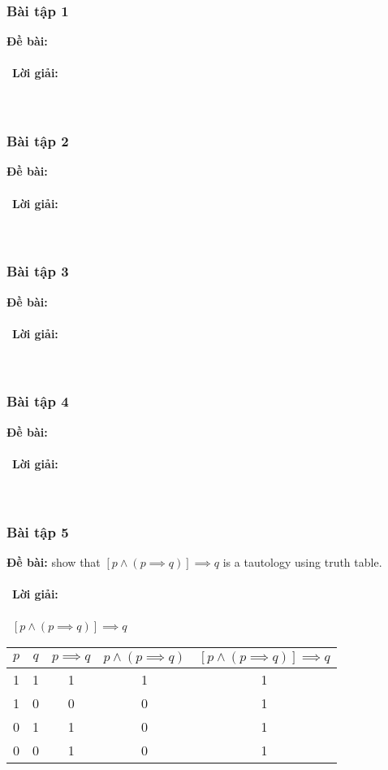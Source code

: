 \documentclass[a4paper]{article}
\begin{document}
\subsubsection{Bài tập 1}
\textbf{Đề bài:} 
\\\ \\\
\textbf{Lời giải:} \\\ \\\
\clearpage
\subsubsection{Bài tập 2}
\textbf{Đề bài:} 
\\\ \\\
\textbf{Lời giải:} \\\ \\\
\clearpage
\subsubsection{Bài tập 3}
\textbf{Đề bài:} 
\\\ \\\
\textbf{Lời giải:} \\\ \\\
\clearpage
\subsubsection{Bài tập 4}
\textbf{Đề bài:} 
\\\ \\\
\textbf{Lời giải:} \\\ \\\
\clearpage
\subsubsection{Bài tập 5}
\textbf{Đề bài:} show that $[p \land (p \implies q)] \implies q$ is a tautology using truth table.
\\\ \\\
\textbf{Lời giải:} \\\ \\\
$[p \land (p \implies q)] \implies q$\\
\begin{table} [h]
	\centering
	\begin{tabular} {|c|c|c|c|c|}
		\hline
		$p$&$q$&$p \implies q$& $p \land (p \implies q)$ &$[p \land (p \implies q)]\implies q$\\
		\hline
		1&1&1&1&1\\
		\hline
		1&0&0&0&1\\
		\hline
		0&1&1&0&1\\
		\hline
		0&0&1&0&1\\
		\hline
	\end{tabular}
\end{table}
\clearpage
\end{document}
